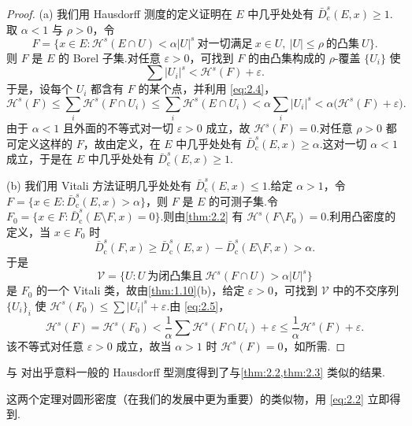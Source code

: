 \begin{proof}
(a) 我们用 Hausdorff 测度的定义证明在 $E$ 中几乎处处有 $\bar{D}^s_{\mathrm{c}}(E,x)\geq 1$.取 $\alpha<1$ 与 $\rho>0$，令
\begin{equation}\label{eq:2.4}
  F=\bigl\{x\in E:\mathcal{H}^{s}(E\cap U)<\alpha|U|^{s}\ \text{对一切满足}\ x\in U,\ |U|\leq\rho\ \text{的凸集}\ U\bigr\}.
\end{equation}
则 $F$ 是 $E$ 的 Borel 子集.对任意 $\varepsilon>0$，可找到 $F$ 的由凸集构成的 $\rho$-覆盖 $\{U_i\}$ 使
\[
  \sum|U_i|^{s}<\mathcal{H}^{s}(F)+\varepsilon.
\]
于是，设每个 $U_i$ 都含有 $F$ 的某个点，并利用 \eqref{eq:2.4}，
\[
  \mathcal{H}^{s}(F)
  \leq\sum_{i}\mathcal{H}^{s}(F\cap U_i)
  \leq\sum_{i}\mathcal{H}^{s}(E\cap U_i)
  <\alpha\sum_{i}|U_i|^{s}
  <\alpha\bigl(\mathcal{H}^{s}(F)+\varepsilon\bigr).
\]
由于 $\alpha<1$ 且外面的不等式对一切 $\varepsilon>0$ 成立，故 $\mathcal{H}^s(F)=0$.对任意 $\rho>0$ 都可定义这样的 $F$，故由定义，在 $E$ 中几乎处处有 $\bar{D}^s_{\mathrm{c}}(E,x)\geq\alpha$.这对一切 $\alpha<1$ 成立，于是在 $E$ 中几乎处处有 $\bar{D}^s_{\mathrm{c}}(E,x)\geq 1$.

(b) 我们用 Vitali 方法证明几乎处处有 $\bar{D}^s_{\mathrm{c}}(E,x)\leq 1$.给定 $\alpha>1$，令 $F=\{x\in E:\bar{D}^s_{\mathrm{c}}(E,x)>\alpha\}$，则 $F$ 是 $E$ 的可测子集.令 $F_0=\{x\in F:\bar{D}^s_{\mathrm{c}}(E\setminus F,x)=0\}$.则由\cref{thm:2.2} 有 $\mathcal{H}^s(F\setminus F_0)=0$.利用凸密度的定义，当 $x\in F_0$ 时
\[
  \bar{D}^{s}_{\mathrm{c}}(F,x)\geq\bar{D}^{s}_{\mathrm{c}}(E,x)-\bar{D}^{s}_{\mathrm{c}}(E\setminus F,x)>\alpha.
\]
于是
\begin{equation}\label{eq:2.5}
  \mathcal{V}=\{U:U\ \text{为闭凸集且}\ \mathcal{H}^{s}(F\cap U)>\alpha|U|^{s}\}
\end{equation}
是 $F_0$ 的一个 Vitali 类，故由\cref{thm:1.10}(b)，给定 $\varepsilon>0$，可找到 $\mathcal{V}$ 中的不交序列 $\{U_i\}_i$ 使 $\mathcal{H}^s(F_0)\leq\sum|U_i|^s+\varepsilon$.由 \eqref{eq:2.5}，
\[
  \mathcal{H}^{s}(F)=\mathcal{H}^{s}(F_0)
  <\frac{1}{\alpha}\sum\mathcal{H}^{s}(F\cap U_i)+\varepsilon
  \leq\frac{1}{\alpha}\mathcal{H}^{s}(F)+\varepsilon.
\]
该不等式对任意 $\varepsilon>0$ 成立，故当 $\alpha>1$ 时 $\mathcal{H}^s(F)=0$，如所需.
\end{proof}

\textcite{freilich1966} 与 \textcite{daviessamuels1974} 对出乎意料一般的 Hausdorff 型测度得到了与\cref{thm:2.2,thm:2.3} 类似的结果.

这两个定理对圆形密度（在我们的发展中更为重要）的类似物，用 \eqref{eq:2.2} 立即得到.


